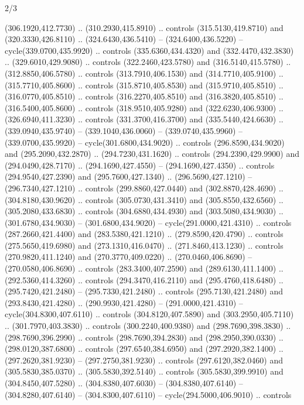 \begin{flagdescription}{2/3}
\begin{scope}[xshift=0.5\flaglength]
\begin{scope}[scale=0.00209\flagwidth,yshift=170mm,xshift=-360]
\begin{scope}[y=-0.8pt, x=0.8pt, inner sep=0pt, outer sep=0pt]
\begin{scope}[cm={{-1.0,0.0,0.0,1.0,(900.0,0.0)}}]
  (306.1920,412.7730) .. (310.2930,415.8910) .. controls (315.5130,419.8710) and
  (320.3330,426.8110) .. (324.6430,436.5410) -- (324.6400,436.5220) --
  cycle(339.0700,435.9920) .. controls (335.6360,434.4320) and
  (332.4470,432.3830) .. (329.6010,429.9080) .. controls (322.2460,423.5780) and
  (316.5140,415.5780) .. (312.8850,406.5780) .. controls (313.7910,406.1530) and
  (314.7710,405.9100) .. (315.7710,405.8600) .. controls (315.8710,405.8530) and
  (315.9710,405.8510) .. (316.0770,405.8510) .. controls (316.2270,405.8510) and
  (316.3820,405.8510) .. (316.5400,405.8600) .. controls (318.9510,405.9280) and
  (322.6230,406.9300) .. (326.6940,411.3230) .. controls (331.3700,416.3700) and
  (335.5440,424.6630) .. (339.0940,435.9740) -- (339.1040,436.0060) --
  (339.0740,435.9960) -- (339.0700,435.9920) -- cycle(301.6800,434.9020) ..
  controls (296.8590,434.9020) and (295.2090,432.2870) .. (294.7230,431.1620) ..
  controls (294.2390,429.9900) and (294.0490,428.7170) .. (294.1690,427.4550) --
  (294.1690,427.4350) .. controls (294.9540,427.2390) and (295.7600,427.1340) ..
  (296.5690,427.1210) -- (296.7340,427.1210) .. controls (299.8860,427.0440) and
  (302.8870,428.4690) .. (304.8180,430.9620) .. controls (305.0730,431.3410) and
  (305.8550,432.6560) .. (305.2080,433.6830) .. controls (304.6880,434.4930) and
  (303.5080,434.9030) .. (301.6780,434.9030) -- (301.6800,434.9020) --
  cycle(291.0000,421.4310) .. controls (287.2660,421.4400) and
  (283.5380,421.1210) .. (279.8590,420.4790) .. controls (275.5650,419.6980) and
  (273.1310,416.0470) .. (271.8460,413.1230) .. controls (270.9820,411.1240) and
  (270.3770,409.0220) .. (270.0460,406.8690) -- (270.0580,406.8690) .. controls
  (283.3400,407.2590) and (289.6130,411.1400) .. (292.5360,414.3260) .. controls
  (294.3470,416.2110) and (295.4760,418.6480) .. (295.7420,421.2480) --
  (295.7330,421.2480) .. controls (295.7130,421.2480) and (293.8430,421.4280) ..
  (290.9930,421.4280) -- (291.0000,421.4310) -- cycle(304.8300,407.6110) ..
  controls (304.8120,407.5890) and (303.2950,405.7110) .. (301.7970,403.3830) ..
  controls (300.2240,400.9380) and (298.7690,398.3830) .. (298.7690,396.2990) ..
  controls (298.7690,394.2830) and (298.2950,390.0330) .. (298.0120,387.6800) ..
  controls (297.6540,384.6950) and (297.2920,382.1400) .. (297.2620,381.9230) --
  (297.2750,381.9230) .. controls (297.6120,382.0460) and (305.5830,385.0370) ..
  (305.5830,392.5140) .. controls (305.5830,399.9910) and (304.8450,407.5280) ..
  (304.8380,407.6030) -- (304.8380,407.6140) -- (304.8280,407.6140) --
  (304.8300,407.6110) -- cycle(294.5000,406.9010) .. controls

\end{scope}
\end{scope}
\end{scope}
\end{scope}
\end{flagdescription}
